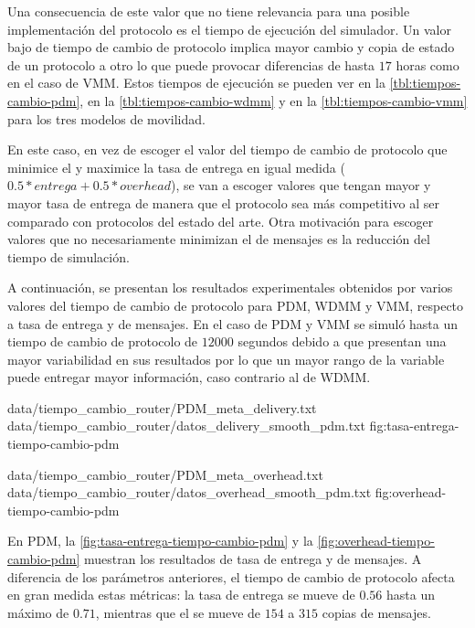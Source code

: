 Una consecuencia de este valor que no tiene relevancia para una posible
implementación del protocolo es el tiempo de ejecución del simulador. Un valor
bajo de tiempo de cambio de protocolo implica mayor cambio y copia de estado de
un protocolo a otro lo que puede provocar diferencias de hasta $17$ horas como
en el caso de VMM. Estos tiempos de ejecución se pueden ver en la
\ref{tbl:tiempos-cambio-pdm}, en la \ref{tbl:tiempos-cambio-wdmm} y en la
\ref{tbl:tiempos-cambio-vmm} para los tres modelos de movilidad.


En este caso, en vez de escoger el valor del tiempo de cambio de protocolo que
minimice el \overhead{} y maximice la tasa de entrega en igual medida
($0.5*entrega + 0.5*overhead$), se van a escoger valores que tengan mayor
\overhead{} y mayor tasa de entrega de manera que el protocolo sea más
competitivo al ser comparado con protocolos del estado del arte. Otra
motivación para escoger valores que no necesariamente minimizan el \overhead{} de
mensajes es la reducción del tiempo de simulación.

A continuación, se presentan los resultados experimentales obtenidos por varios
valores del tiempo de cambio de protocolo para PDM, WDMM y VMM, respecto a tasa
de entrega y \overhead{} de mensajes. En el caso de PDM y VMM se simuló hasta un
tiempo de cambio de protocolo de $12000$ segundos debido a que presentan una
mayor variabilidad en sus resultados por lo que un mayor rango de la variable
puede entregar mayor información, caso contrario al de WDMM.






{
{data/tiempo_cambio_router/PDM_meta_delivery.txt}
{data/tiempo_cambio_router/datos_delivery_smooth_pdm.txt}
}{fig:tasa-entrega-tiempo-cambio-pdm}


{
{data/tiempo_cambio_router/PDM_meta_overhead.txt}
{data/tiempo_cambio_router/datos_overhead_smooth_pdm.txt}
}{fig:overhead-tiempo-cambio-pdm}

En PDM, la \ref{fig:tasa-entrega-tiempo-cambio-pdm} y la
\ref{fig:overhead-tiempo-cambio-pdm} muestran los resultados de tasa de entrega
y \overhead{} de mensajes. A diferencia de los parámetros anteriores, el tiempo
de cambio de protocolo afecta en gran medida estas métricas: la tasa de entrega
se mueve de $0.56$ hasta un máximo de $0.71$, mientras que el \overhead{} se
mueve de $154$ a $315$ copias de mensajes.

